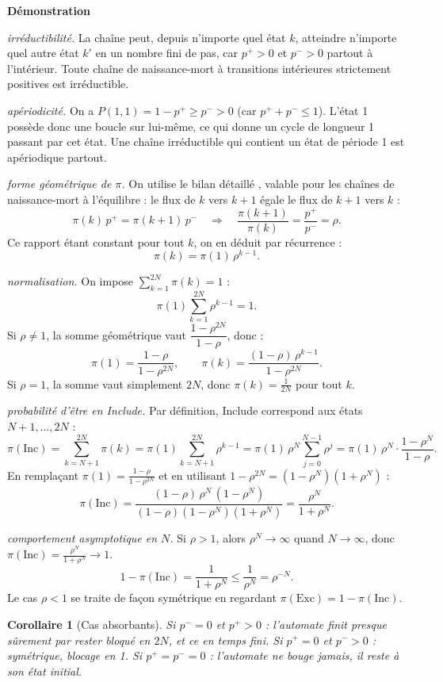\documentclass[11pt]{article}
\newtheorem{corollary}{Corollaire}
\begin{document}
\textbf{Démonstration}

\textit{irréductibilité.} La chaîne peut, depuis n'importe quel état $k$, atteindre n'importe quel autre état $k'$ en un nombre fini de pas, car $p^+ > 0$ et $p^- > 0$ partout à l'intérieur. Toute chaîne de naissance-mort à transitions intérieures strictement positives est irréductible.


\textit{apériodicité.} On a $P(1,1) = 1-p^+ \ge p^- > 0$ (car $p^+ + p^- \le 1$). L'état 1 possède donc une boucle sur lui-même, ce qui donne un cycle de longueur 1 passant par cet état. Une chaîne irréductible qui contient un état de période 1 est apériodique partout.

\textit{forme géométrique de $\pi$.} On utilise le bilan détaillé , valable pour les chaînes de naissance-mort à l'équilibre : le flux de $k$ vers $k+1$ égale le flux de $k+1$ vers $k$ :
$$\pi(k) \, p^+ = \pi(k+1)\, p^- \quad \Longrightarrow \quad \frac{\pi(k+1)}{\pi(k)} = \frac{p^+}{p^-} = \rho.$$
Ce rapport étant constant pour tout $k$, on en déduit par récurrence :
$$\pi(k) = \pi(1) \, \rho^{k-1}.$$

\textit{ normalisation.} On impose $\sum_{k=1}^{2N} \pi(k) = 1$ :
$$\pi(1) \sum_{k=1}^{2N} \rho^{k-1} = 1.$$
Si $\rho \ne 1$, la somme géométrique vaut $\dfrac{1-\rho^{2N}}{1-\rho}$, donc :
$$\pi(1) = \frac{1-\rho}{1-\rho^{2N}}, \qquad \pi(k) = \frac{(1-\rho)\,\rho^{k-1}}{1-\rho^{2N}}.$$
Si $\rho = 1$, la somme vaut simplement $2N$, donc $\pi(k) = \frac{1}{2N}$ pour tout $k$.

\textit{probabilité d'être en Include.} Par définition, Include correspond aux états $N+1, \dots, 2N$ :
$$\pi(\text{Inc}) = \sum_{k=N+1}^{2N} \pi(k) = \pi(1) \sum_{k=N+1}^{2N} \rho^{k-1} = \pi(1)\,\rho^N \sum_{j=0}^{N-1}\rho^j = \pi(1)\,\rho^N \cdot \frac{1-\rho^N}{1-\rho}.$$
En remplaçant $\pi(1) = \frac{1-\rho}{1-\rho^{2N}}$ et en utilisant $1-\rho^{2N} = (1-\rho^N)(1+\rho^N)$ :
$$\pi(\text{Inc}) = \frac{(1-\rho)\,\rho^N \,(1-\rho^N)}{(1-\rho)(1-\rho^N)(1+\rho^N)} = \frac{\rho^N}{1+\rho^N}.$$

\textit{comportement asymptotique en $N$.} Si $\rho > 1$, alors $\rho^N \to \infty$ quand $N \to \infty$, donc $\pi(\text{Inc}) = \frac{\rho^N}{1+\rho^N} \to 1$.
$$1 - \pi(\text{Inc}) = \frac{1}{1+\rho^N} \le \frac{1}{\rho^N} = \rho^{-N}.$$
Le cas $\rho < 1$ se traite de façon symétrique en regardant $\pi(\text{Exc}) = 1 - \pi(\text{Inc})$.



\begin{corollary}[Cas absorbants]\label{cor:absorb}
Si $p^- = 0$ et $p^+ > 0$ : l'automate finit presque sûrement par rester bloqué en $2N$, et ce en temps fini. Si $p^+ = 0$ et $p^- > 0$ : symétrique, blocage en 1. Si $p^+ = p^- = 0$ : l'automate ne bouge jamais, il reste à son état initial.
\end{corollary}
\end{document}
